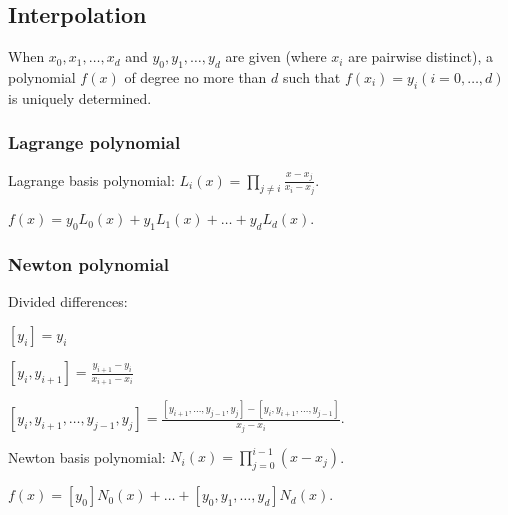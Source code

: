 \subsection{Interpolation}

When $x_0, x_1, \dots, x_d$ and $y_0, y_1, \dots, y_d$
are given (where $x_i$ are pairwise distinct), a polynomial
$f(x)$ of degree no more than $d$ such that $f(x_i) = y_i (i = 0, \dots, d)$
is uniquely determined.

\subsubsection{Lagrange polynomial}

Lagrange basis polynomial: $L_i(x) = \prod_{j \ne i} \frac{x - x_j}{x_i - x_j}$.
	
$f(x) = y_0 L_0(x) + y_1 L_1(x) + \dots + y_d L_d(x)$.

\subsubsection{Newton polynomial}

Divided differences:

$[y_i] = y_i$

$[y_i, y_{i + 1}] = \frac{y_{i + 1} - y_i}{x_{i + 1} - x_i}$

$[y_i, y_{i + 1}, \dots, y_{j - 1}, y_j] = \frac{[y_{i + 1}, \dots, y_{j - 1}, y_j] - [y_i, y_{i + 1}, \dots, y_{j - 1}]}{x_j - x_i}$.

Newton basis polynomial: $N_i(x) = \prod_{j=0}^{i-1} (x - x_j)$.

$f(x) = [y_0] N_0(x) + \dots + [y_0, y_1, \dots, y_d] N_d(x)$.
